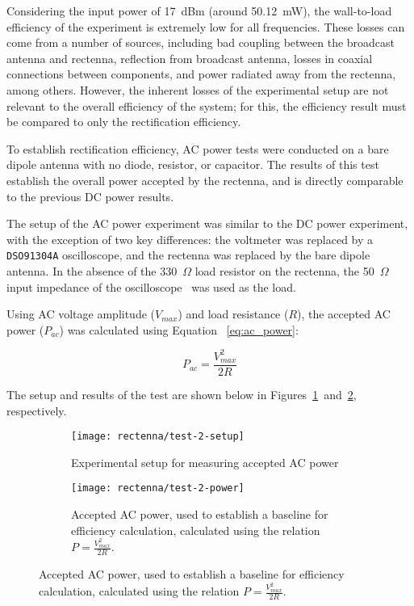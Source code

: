Considering the input power of 17~dBm (around 50.12~mW), the wall-to-load efficiency of the experiment is extremely low for all frequencies. These losses can come from a number of sources, including bad coupling between the broadcast antenna and rectenna, reflection from broadcast antenna, losses in coaxial connections between components, and power radiated away from the rectenna, among others. However, the inherent losses of the experimental setup are not relevant to the overall efficiency of the system; for this, the efficiency result must be compared to only the rectification efficiency.

To establish rectification efficiency, AC power tests were conducted on a bare dipole antenna with no diode, resistor, or capacitor. The results of this test establish the overall power accepted by the rectenna, and is directly comparable to the previous DC power results.

The setup of the AC power experiment was similar to the DC power experiment, with the exception of two key differences: the voltmeter was replaced by a \texttt{DSO91304A} oscilloscope, and the rectenna was replaced by the bare dipole antenna. In the absence of the 330~$\Omega$ load resistor on the rectenna, the 50~$\Omega$ input impedance of the oscilloscope~\cite{DSO91304A-manual} was used as the load.

Using AC voltage amplitude ($V_{max}$) and load resistance ($R$), the accepted AC power ($P_{ac}$) was calculated using Equation ~\ref{eq:ac_power}:

\begin{equation}
P_{ac} = \frac{V_{max}^2}{2R}
\label{eq:ac_power}
\end{equation}

The setup and results of the test are shown below in Figures~\ref{fig:rectenna-test-2-setup}~and~\ref{fig:rectenna-test-2-power}, respectively.

\begin{figure}[h!]
    \centering
    \begin{subfigure}{.85\textwidth}
        \centering
        \texttt{[image: rectenna/test-2-setup]}
        \caption{Experimental setup for measuring accepted AC power}
        \label{fig:rectenna-test-2-setup}
    \end{subfigure}
    \begin{subfigure}{.85\textwidth}
        \centering
        \texttt{[image: rectenna/test-2-power]}
        \caption[Accepted AC power]{Accepted AC power, used to establish a baseline for efficiency calculation, calculated using the relation $P = \frac{V_{max}^2}{2R}$.}
        \label{fig:rectenna-test-2-power}
    \end{subfigure}
    \label{fig:rectenna-test-2}
\end{figure}

